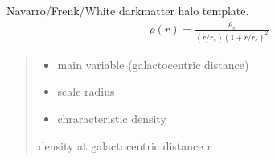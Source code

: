 \documentclass[letterpaper,10pt,english]{sphinxmanual}
\begin{document}

\begin{fulllineitems}
\label{\detokenize{diffsph.profiles:diffsph.profiles.templates.nfw}}
\pysigstartsignatures
{}
\pysigstopsignatures
\sphinxAtStartPar
Navarro/Frenk/White dark\sphinxhyphen{}matter halo template.
\begin{equation*}
\begin{split}\rho(r) = \frac{\rho_s}{(r/r_s)(1+r/r_s)^2}\end{split}
\end{equation*}\begin{quote}\begin{description}
\begin{itemize}
\item {} 
\sphinxAtStartPar
{} \textendash{} main variable (galactocentric distance)

\item {} 
\sphinxAtStartPar
{} \textendash{} scale radius

\item {} 
\sphinxAtStartPar
{} \textendash{} chraracteristic density

\end{itemize}

\sphinxAtStartPar
density at galactocentric distance \(r\)

\end{description}\end{quote}

\end{fulllineitems}

\end{document}
